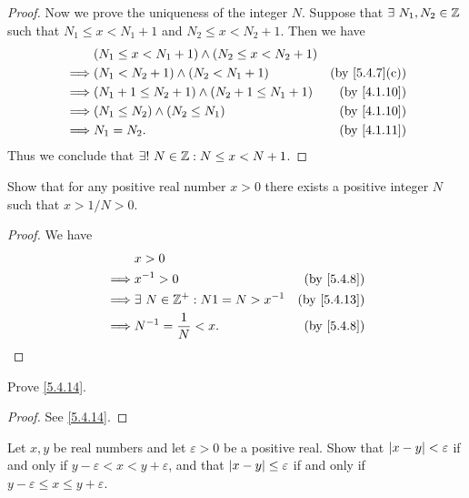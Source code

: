 \begin{proof}
  Now we prove the uniqueness of the integer \(N\).
  Suppose that \(\exists\ N_1, N_2 \in \mathbb{Z}\) such that \(N_1 \leq x < N_1 + 1\) and \(N_2 \leq x < N_2 + 1\).
  Then we have
  \begin{align*}
             & (N_1 \leq x < N_1 + 1) \land (N_2 \leq x < N_2 + 1)                               \\
    \implies & (N_1 < N_2 + 1) \land (N_2 < N_1 + 1)               & \text{(by \cref{5.4.7}(c))} \\
    \implies & (N_1 + 1 \leq N_2 + 1) \land (N_2 + 1 \leq N_1 + 1) & \text{(by \cref{4.1.10})}   \\
    \implies & (N_1 \leq N_2) \land (N_2 \leq N_1)                 & \text{(by \cref{4.1.10})}   \\
    \implies & N_1 = N_2.                                          & \text{(by \cref{4.1.11})}
  \end{align*}
  Thus we conclude that \(\exists!\ N \in \mathbb{Z} : N \leq x < N + 1\).
\end{proof}

\begin{ex}\label{ex:5.4.4}
  Show that for any positive real number \(x > 0\) there exists a positive integer \(N\) such that \(x > 1 / N > 0\).
\end{ex}

\begin{proof}
  We have
  \begin{align*}
             & x > 0                                                             \\
    \implies & x^{-1} > 0                            & \text{(by \cref{5.4.8})}  \\
    \implies & \exists\ N \in \Z^+ : N1 = N > x^{-1} & \text{(by \cref{5.4.13})} \\
    \implies & N^{-1} = \frac{1}{N} < x.             & \text{(by \cref{5.4.8})}
  \end{align*}
\end{proof}

\begin{ex}\label{ex:5.4.5}
  Prove \cref{5.4.14}.
\end{ex}

\begin{proof}
  See \cref{5.4.14}.
\end{proof}

\begin{ex}\label{ex:5.4.6}
  Let \(x, y\) be real numbers and let \(\varepsilon > 0\) be a positive real.
  Show that \(\left\lvert x - y\right\rvert < \varepsilon\) if and only if \(y - \varepsilon < x < y + \varepsilon\), and that \(\left\lvert x - y\right\rvert \leq \varepsilon\) if and only if \(y - \varepsilon \leq x \leq y + \varepsilon\).
\end{ex}

